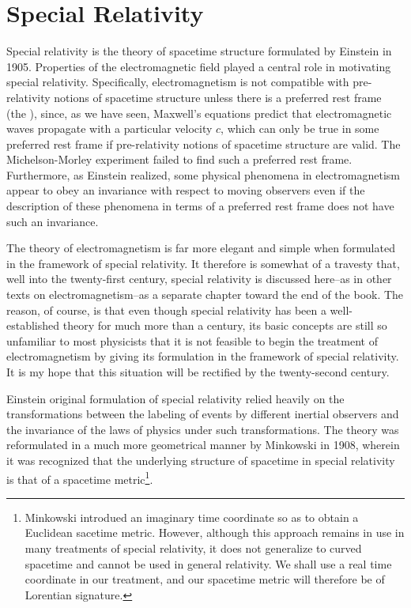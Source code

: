 \chapter{Special Relativity}
\label{ch:Wald_08}

Special relativity is the theory of spacetime structure formulated by Einstein in 1905. Properties of the electromagnetic field played a central role in motivating special relativity. Specifically, electromagnetism is not compatible with pre-relativity notions of spacetime structure unless there is a preferred rest frame (the ), since, as we have seen, Maxwell's equations predict that electromagnetic waves propagate with a particular velocity $c$, which can only be true in some preferred rest frame if pre-relativity notions of spacetime structure are valid. The Michelson-Morley experiment failed to find such a preferred rest frame. Furthermore, as Einstein realized, some physical phenomena in electromagnetism appear to obey an invariance with respect to moving observers even if the description of these phenomena in terms of a preferred rest frame does not have such an invariance.

The theory of electromagnetism is far more elegant and simple when formulated in the framework of special relativity. It therefore is somewhat of a travesty that, well into the twenty-first century, special relativity is discussed here--as in other texts on electromagnetism--as a separate chapter toward the end of the book. The reason, of course, is that even though special relativity has been a well-established theory for much more than a century, its basic concepts are still so unfamiliar to most physicists that it is not feasible to begin the treatment of electromagnetism by giving its formulation in the framework of special relativity. It is my hope that this situation will be rectified by the twenty-second century. 

Einstein original formulation of special relativity relied heavily on the transformations between the labeling of events by different inertial observers and the invariance of the laws of physics under such transformations. The theory was reformulated in a much more geometrical manner by Minkowski in 1908, wherein it was recognized that the underlying structure of spacetime in special relativity is that of a spacetime metric\footnote{Minkowski introdued an imaginary time coordinate so as to obtain a Euclidean sacetime metric. However, although this approach remains in use in many treatments of special relativity, it does not generalize to curved spacetime and cannot be used in general relativity. We shall use a real time coordinate in our treatment, and our spacetime metric will therefore be of Lorentian signature.}.

